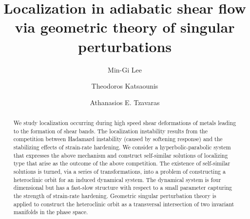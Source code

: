 \documentclass[11pt]{article}
\theoremstyle{remark}
\begin{document}
\title{Localization in adiabatic shear flow \\via geometric theory of singular perturbations}
\author{  Min-Gi Lee \footnotemark[4] \and Theodoros Katsaounis\footnotemark[1] \footnotemark[2]  \footnotemark[3]
\and Athanasios E. Tzavaras\footnotemark[1] \footnotemark[2] \footnotemark[5]} %
\date{}

\maketitle
\renewcommand{\thefootnote}{\fnsymbol{footnote}}

\renewcommand{\thefootnote}{\arabic{footnote}}


\maketitle



\baselineskip=14pt

\begin{abstract}
We study localization occurring during high speed shear deformations of metals leading to the formation of shear bands.
The localization instability results from the competition between  Hadamard instability (caused by softening response) and the stabilizing effects of strain-rate hardening.  We consider a hyperbolic-parabolic system that expresses the above mechanism and construct
self-similar solutions of localizing type that arise as the outcome of the above competition.
The existence of self-similar solutions is turned, via a series of transformations,
 into a problem of constructing a heteroclinic orbit for an induced dynamical system.
The dynamical system is four dimensional but has a fast-slow structure
with respect to a small parameter capturing the strength of strain-rate hardening.
 Geometric singular perturbation theory is applied to construct the heteroclinic orbit as a transversal intersection of two invariant manifolds in the phase space.
\end{abstract}
\end{document}
